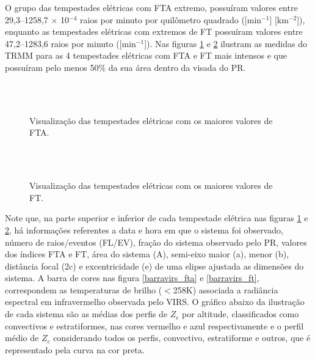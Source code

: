 O grupo das tempestades elétricas com FTA extremo, possuíram valores entre {29,3--1258,7 $\times$ 10$^{-4}$} raios por minuto por quilômetro quadrado ([min$^{-1}$] [km$^{-2}$]), enquanto as tempestades elétricas com extremos de FT possuíram valores entre {47,2--1283,6} raios por minuto ([min$^{-1}$]). Nas figuras \ref{topFTA} e \ref{topFT} ilustram as medidas do TRMM para as 4 tempestades elétricas com FTA e FT mais intensos e que possuíram pelo menos 50\% da sua área dentro da visada do PR.  


\begin{figure}[!hb]
  \centering  
  \\
   \\
  \caption{Visualização das tempestades elétricas com os maiores valores de FTA.} %
\label{topFTA}
\end{figure}

\begin{figure}[!hb]
  \centering 
  \\
   \\
  \caption{Visualização das tempestades elétricas com os maiores valores de FT.} %
\label{topFT}
\end{figure}

Note que, na parte superior e inferior de cada tempestade elétrica nas figuras \ref{topFTA} e \ref{topFT}, há informações referentes a data e hora em que o sistema foi observado, número de raios/eventos (FL/EV), fração do sistema observado pelo PR, valores dos índices FTA e FT, área do sistema (A), semi-eixo maior (a), menor (b), distância focal (2c) e excentricidade (e) de uma elipse ajustada as dimensões do sistema. A barra de cores nas figura \ref{barravirs_fta} e \ref{barravirs_ft}, correspondem as temperaturas de brilho ($<$258K) associada a radiância espectral em infravermelho observada pelo VIRS. O gráfico abaixo da ilustração de cada sistema são as médias dos perfis de $Z_c$ por altitude, classificados como convectivos e estratiformes, nas cores vermelho e azul respectivamente e o perfil médio de $Z_c$ considerando todos os perfis, convectivo, estratiforme e outros, que é representado pela curva na cor preta.

